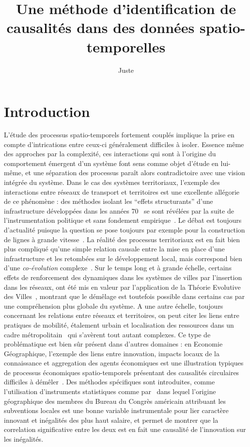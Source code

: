 \documentclass[french]{./sageo}
\title[Causalités Spatio-temporelles]{Une méthode d'identification de causalités dans des données spatio-temporelles}
\author[1,2]{Juste}{Raimbault}
\begin{document}
\maketitle

\newpage



\section{Introduction}



L'étude des processus spatio-temporels fortement couplés implique la prise en compte d'intrications entre ceux-ci généralement difficiles à isoler. Essence même des approches par la complexité, ces interactions qui sont à l'origine du comportement émergent d'un système font sens comme objet d'étude en lui-même, et une séparation des processus paraît alors contradictoire avec une vision intégrée du système. Dans le cas des systèmes territoriaux, l'exemple des interactions entre réseaux de transport et territoires est une excellente allégorie de ce phénomène : des méthodes isolant les ``effets structurants'' d'une infrastructure développées dans les années 70~\cite{bonnafous1974methodologies} se sont révélées par la suite de l'instrumentation politique et sans fondement empirique~\cite{offner1993effets}. Le débat est toujours d'actualité puisque la question se pose toujours par exemple pour la construction de lignes à grande vitesse~\cite{crozethalshs01094554}. La réalité des processus territoriaux est en fait bien plus compliqué qu'une simple relation causale entre la mise en place d'une infrastructure et les retombées sur le développement local, mais correspond bien d'une \emph{co-évolution} complexe~\cite{bretagnolletel00459720}. Sur le temps long et à grande échelle, certains effets de renforcement des dynamiques dans les systèmes de villes par l'insertion dans les réseaux, ont été mis en valeur par l'application de la Théorie Evolutive des Villes~\cite{espacegeo2014effets}, montrant que le démêlage est toutefois possible dans certains cas par une compréhension plus globale du système. A une autre échelle, toujours concernant les relations entre réseaux et territoires, on peut citer les liens entre pratiques de mobilité, étalement urbain et localisation des ressources dans un cadre métropolitain~\cite{cerqueira2017inegalites} qui s'avèrent tout autant complexes. Ce type de problématique est bien sûr présent dans d'autres domaines : en Economie Géographique, l'exemple des liens entre innovation, impacts locaux de la connaissance et aggregation des agents économiques est une illustration typiques de processus économiques spatio-temporels présentant des causalités circulaires difficiles à démêler~\cite{audretsch1996r}. Des méthodes spécifiques sont introduites, comme l'utilisation d'instruments statistiques comme par~\cite{aghion2015innovation} dans lequel l'origine géographique des membres du Bureau du Congrès américain attribuant les subventions locales est une bonne variable instrumentale pour lier caractère innovant et inégalités des plus haut salaire, et permet de montrer que la correlation significative entre les deux est en fait une causalité de l'innovation sur les inégalités.
\end{document}
